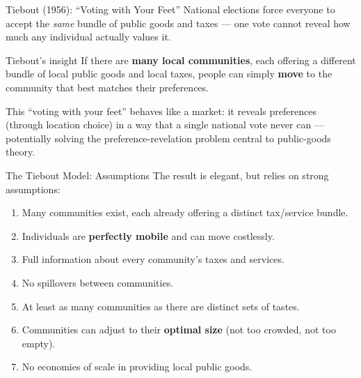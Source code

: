 \documentclass[11pt,aspectratio=169]{beamer}
\begin{document}
\begin{frame}{Tiebout (1956): ``Voting with Your Feet''}
  National elections force everyone to accept the \emph{same} bundle of public goods and taxes --- one vote cannot reveal how much any individual actually values it.
  \begin{block}{Tiebout's insight}
    If there are \textbf{many local communities}, each offering a different bundle of local public goods and local taxes, people can simply \textbf{move} to the community that best matches their preferences.
  \end{block}
  \vspace{0.4em}
  \small This ``voting with your feet'' behaves like a market: it reveals preferences (through location choice) in a way that a single national vote never can --- potentially solving the preference-revelation problem central to public-goods theory.
\end{frame}

\begin{frame}{The Tiebout Model: Assumptions}
  The result is elegant, but relies on strong assumptions:
  \begin{enumerate}
    \setlength{\itemsep}{2pt}
    \item Many communities exist, each already offering a distinct tax/service bundle.
    \item Individuals are \textbf{perfectly mobile} and can move costlessly.
    \item Full information about every community's taxes and services.
    \item No spillovers between communities.
    \item At least as many communities as there are distinct sets of tastes.
    \item Communities can adjust to their \textbf{optimal size} (not too crowded, not too empty).
    \item No economies of scale in providing local public goods.
  \end{enumerate}
\end{frame}
\end{document}
